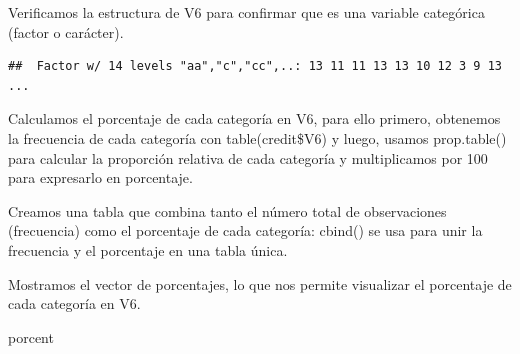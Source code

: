 \documentclass[
]{article}
\newenvironment{Shaded}{\begin{snugshade}}{\end{snugshade}}
\newcommand{\AttributeTok}[1]{\textcolor[rgb]{0.13,0.29,0.53}{#1}}
\newcommand{\DecValTok}[1]{\textcolor[rgb]{0.00,0.00,0.81}{#1}}
\newcommand{\FunctionTok}[1]{\textcolor[rgb]{0.13,0.29,0.53}{\textbf{#1}}}
\newcommand{\NormalTok}[1]{#1}
\newcommand{\OtherTok}[1]{\textcolor[rgb]{0.56,0.35,0.01}{#1}}
\newcommand{\SpecialCharTok}[1]{\textcolor[rgb]{0.81,0.36,0.00}{\textbf{#1}}}
\begin{document}
Verificamos la estructura de V6 para confirmar que es una variable
categórica (factor o carácter).

\begin{Shaded}
\end{Shaded}

\begin{verbatim}
##  Factor w/ 14 levels "aa","c","cc",..: 13 11 11 13 13 10 12 3 9 13 ...
\end{verbatim}

Calculamos el porcentaje de cada categoría en V6, para ello primero,
obtenemos la frecuencia de cada categoría con table(credit\$V6) y luego,
usamos prop.table() para calcular la proporción relativa de cada
categoría y multiplicamos por 100 para expresarlo en porcentaje.

\begin{Shaded}
\end{Shaded}

Creamos una tabla que combina tanto el número total de observaciones
(frecuencia) como el porcentaje de cada categoría: cbind() se usa para
unir la frecuencia y el porcentaje en una tabla única.

\begin{Shaded}
\end{Shaded}

Mostramos el vector de porcentajes, lo que nos permite visualizar el
porcentaje de cada categoría en V6.

\begin{Shaded}
\begin{Highlighting}[]
\NormalTok{porcent}
\end{Highlighting}
\end{Shaded}
\end{document}
